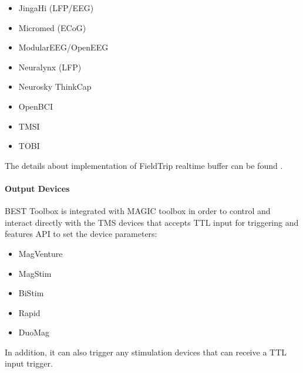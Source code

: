 \documentclass[letterpaper,10pt,english]{sphinxmanual}
\begin{document}
\begin{itemize}
\item {} 
\sphinxAtStartPar
Jinga\sphinxhyphen{}Hi (LFP/EEG)

\item {} 
\sphinxAtStartPar
Micromed (ECoG)

\item {} 
\sphinxAtStartPar
ModularEEG/OpenEEG

\item {} 
\sphinxAtStartPar
Neuralynx (LFP)

\item {} 
\sphinxAtStartPar
Neurosky ThinkCap

\item {} 
\sphinxAtStartPar
OpenBCI

\item {} 
\sphinxAtStartPar
TMSI

\item {} 
\sphinxAtStartPar
TOBI

\end{itemize}

\sphinxAtStartPar
The details about implementation of FieldTrip real\sphinxhyphen{}time buffer can be found .


\paragraph{Output Devices}
\label{\detokenize{1_Home:output-devices}}
\sphinxAtStartPar
BEST Toolbox is integrated with MAGIC toolbox in order to control and interact directly with the TMS devices that accepts TTL input for triggering and features API to set the device parameters:
\begin{itemize}
\item {} 
\sphinxAtStartPar
MagVenture

\item {} 
\sphinxAtStartPar
MagStim

\item {} 
\sphinxAtStartPar
BiStim

\item {} 
\sphinxAtStartPar
Rapid

\item {} 
\sphinxAtStartPar
DuoMag

\end{itemize}

\sphinxAtStartPar
In addition, it can also trigger any stimulation devices that can receive a TTL input trigger.
\end{document}
